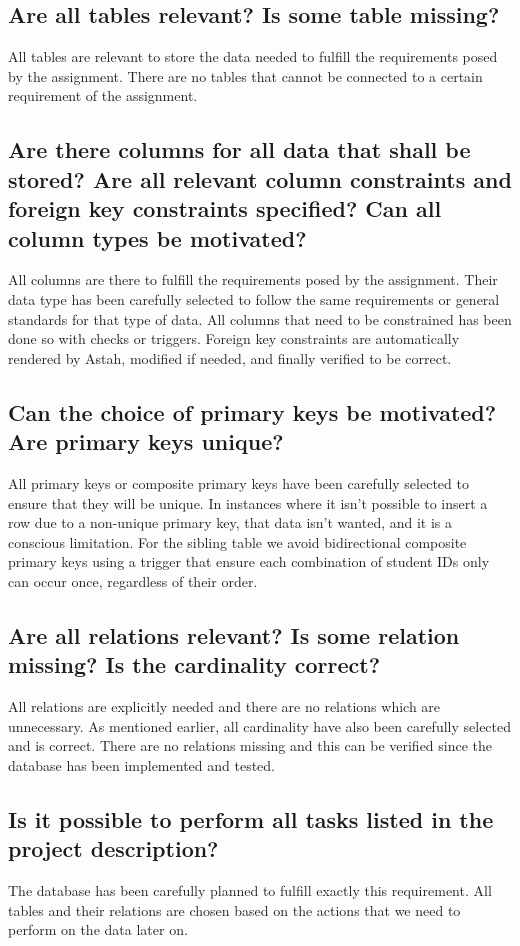 \documentclass[a4paper]{scrartcl}
\begin{document}
\subsection{Are all tables relevant? Is some table missing?}
All tables are relevant to store the data needed to fulfill the requirements posed by the assignment. There are no tables that cannot be connected to a certain requirement of the assignment.


\subsection{Are there columns for all data that shall be stored? Are all relevant column constraints and foreign key constraints specified? Can all column types be motivated?}
All columns are there to fulfill the requirements posed by the assignment. Their data type has been carefully selected to follow the same requirements or general standards for that type of data. All columns that need to be constrained has been done so with checks or triggers. Foreign key constraints are automatically rendered by Astah, modified if needed, and finally verified to be correct.

\subsection{Can the choice of primary keys be motivated? Are primary keys unique?} All primary keys or composite primary keys have been carefully selected to ensure that they will be unique. In instances where it isn't possible to insert a row due to a non-unique primary key, that data isn't wanted, and it is a conscious limitation. For the sibling table we avoid bidirectional composite primary keys using a trigger that ensure each combination of student IDs only can occur once, regardless of their order.


\subsection{Are all relations relevant? Is some relation missing? Is the cardinality correct?}
All relations are explicitly needed and there are no relations which are unnecessary. As mentioned earlier, all cardinality have also been carefully selected and is correct. There are no relations missing and this can be verified since the database has been implemented and tested.

\subsection{Is it possible to perform all tasks listed in the project description?}
The database has been carefully planned to fulfill exactly this requirement. All tables and their relations are chosen based on the actions that we need to perform on the data later on.
\end{document}

